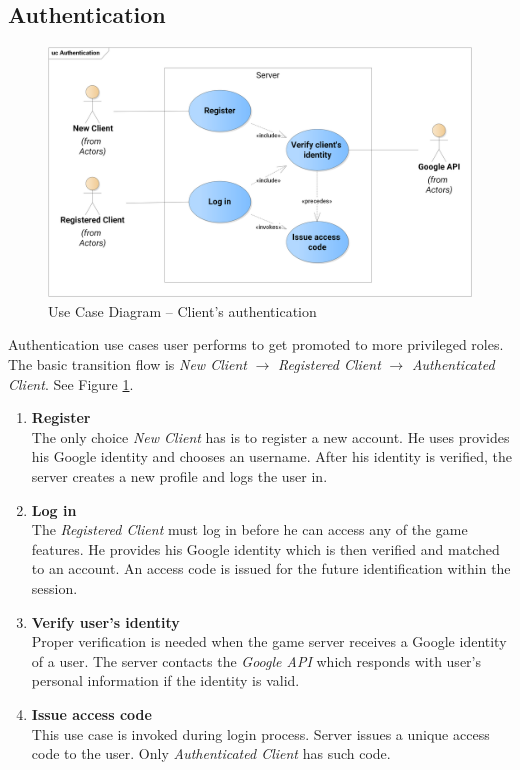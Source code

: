 	\subsection{Authentication}	
	\begin{figure}[h]	
		\includegraphics[width=\textwidth]{figures/UC_Authentication}
		\centering			
		\caption{Use Case Diagram -- Client's authentication}
		\label{fig:ucauth}
	\end{figure}
	\noindent Authentication use cases user performs to get promoted to more privileged roles. The basic transition flow is \textit{New Client} $\rightarrow$ \textit{Registered Client} $\rightarrow$ \textit{Authenticated Client}. See Figure \ref{fig:ucauth}.
	
	\begin{enumerate}
		\item \textbf{Register} \\
		The only choice \textit{New Client} has is to register a new account. He uses provides his Google identity and chooses an username. After his identity is verified, the server creates a new profile and logs the user in.
		
		\item \textbf{Log in} \\
		The \textit{Registered Client} must log in before he can access any of the game features. He provides his Google identity which is then verified and matched to an account. An access code is issued for the future identification within the session.		
		
		\item \textbf{Verify user's identity} \\
		Proper verification is needed when the game server receives a Google identity of a user. The server contacts the \textit{Google API} which responds with user's personal information if the identity is valid.
		
		\item \textbf{Issue access code} \\ 
		This use case is invoked during login process. Server issues a unique access code to the user. Only \textit{Authenticated Client} has such code.
	\end{enumerate}
	
